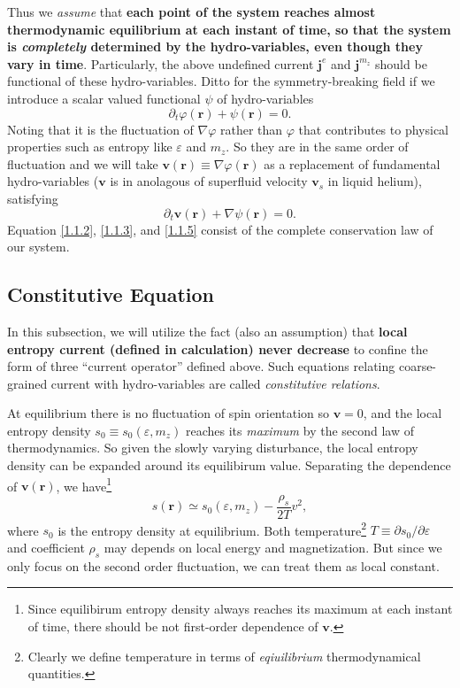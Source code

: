 \documentclass[10pt,nofootinbib]{revtex4}
\begin{document}
		Thus we \emph{assume} that {\bf each point of the system reaches almost thermodynamic equilibrium at each instant of time, so that the system is \emph{completely} determined by the hydro-variables, even though they vary in time}. Particularly, the above undefined current $\bm{j}^e$ and $\bm{j}^{m_z}$ should be functional of these hydro-variables. Ditto for the symmetry-breaking field if we introduce a scalar valued functional $\psi$ of hydro-variables
		\begin{equation}\label{1.1.4}
			\partial_t \varphi(\bm{r})+\psi(\bm{r})=0.
		\end{equation}
		Noting that it is the fluctuation of $\nabla\varphi$ rather than $\varphi$ that contributes to physical properties such as entropy like $\varepsilon$ and $m_z$. So they are in the same order of fluctuation and we will take $\bm{v}(\bm{r})\equiv\nabla\varphi(\bm{r})$ as a replacement of fundamental hydro-variables ($\bm{v}$ is in anolagous of superfluid velocity $\bm{v}_s$ in liquid helium), satisfying
		\begin{equation}\label{1.1.5}
			\partial_t\bm{v}(\bm{r})+\nabla\psi(\bm{r})=0.
		\end{equation}
		Equation \eqref{1.1.2}, \eqref{1.1.3}, and \eqref{1.1.5} consist of the complete conservation law of our system.

	\subsection{Constitutive Equation}
		In this subsection, we will utilize the fact (also an assumption) that {\bf local entropy current (defined in calculation) never decrease} to confine the form of three ``current operator'' defined above. Such equations relating coarse-grained current with hydro-variables are called \emph{constitutive relations}.\par
		At equilibrium there is no fluctuation of spin orientation so $\bm{v}=0$, and the local entropy density $s_0\equiv s_0(\varepsilon,m_z)$ reaches its \emph{maximum} by the second law of thermodynamics. So given the slowly varying disturbance, the local entropy density can be expanded around its equilibirum value. Separating the dependence of $\bm{v}(\bm{r})$, we have\footnote{Since equilibirum entropy density always reaches its maximum at each instant of time, there should be not first-order dependence of $\bm{v}$.}
		\begin{equation}\label{1.2.1}
			s(\bm{r})\simeq s_0(\varepsilon,m_z)-\dfrac{\rho_s}{2T}v^2,
		\end{equation}
		where $s_0$ is the entropy density at equilibrium. Both temperature\footnote{Clearly we define temperature in terms of \emph{eqiuilibrium} thermodynamical quantities.} $T\equiv\partial s_0/\partial\varepsilon$ and coefficient $\rho_s$ may depends on local energy and magnetization. But since we only focus on the second order fluctuation, we can treat them as local constant.
\end{document}
